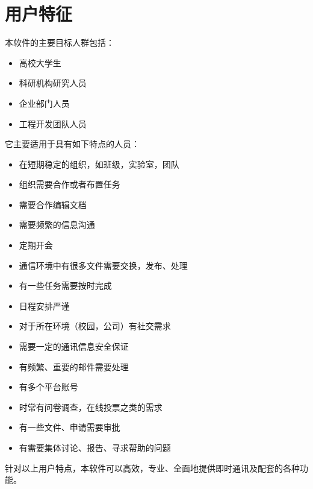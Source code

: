 \section{\color{red} 用户特征}
\noindent
	本软件的主要目标人群包括：
	\begin{itemize}
		\item 高校大学生
		\item 科研机构研究人员
		\item 企业部门人员
		\item 工程开发团队人员
	\end{itemize}
	它主要适用于具有如下特点的人员：
	\begin{itemize}
		\item 在短期稳定的组织，如班级，实验室，团队
		\item 组织需要合作或者布置任务
		\item 需要合作编辑文档
		\item 需要频繁的信息沟通
		\item 定期开会
		\item 通信环境中有很多文件需要交换，发布、处理
		\item 有一些任务需要按时完成
		\item 日程安排严谨
		\item 对于所在环境（校园，公司）有社交需求
		\item 需要一定的通讯信息安全保证
		\item 有频繁、重要的邮件需要处理
		\item {\color{red}有多个平台账号}
		\item {\color{red}时常有问卷调查，在线投票之类的需求}
		\item {\color{red}有一些文件、申请需要审批}
		\item {\color{red}有需要集体讨论、报告、寻求帮助的问题}
	\end{itemize}
	针对以上用户特点，本软件可以高效，专业、全面地提供即时通讯及配套的各种功能。
